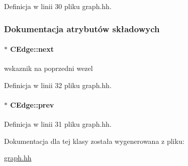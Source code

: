 Definicja w linii 30 pliku graph.\+hh.



\subsubsection{Dokumentacja atrybutów składowych}
\hypertarget{class_c_edge_ad1ee614fba28429ff44c5c793676cbd4}{}
\paragraph[{next}]{$\ast$ C\+Edge\+::next\hspace{0.3cm}{\ttfamily [private]}}\label{class_c_edge_ad1ee614fba28429ff44c5c793676cbd4}
wskaznik na poprzedni wezel 

Definicja w linii 32 pliku graph.\+hh.

\hypertarget{class_c_edge_a6028b71c45755a0f37cd6e240b357bac}{}
\paragraph[{prev}]{$\ast$ C\+Edge\+::prev\hspace{0.3cm}{\ttfamily [private]}}\label{class_c_edge_a6028b71c45755a0f37cd6e240b357bac}


Definicja w linii 31 pliku graph.\+hh.



Dokumentacja dla tej klasy została wygenerowana z pliku\+:\begin{DoxyCompactItemize}
\item 
\hyperlink{graph_8hh}{graph.\+hh}\end{DoxyCompactItemize}
